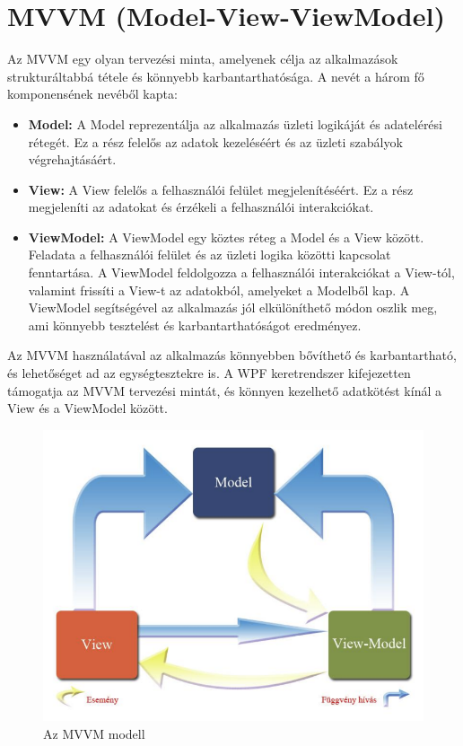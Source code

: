 \documentclass[
]{thesis-ekf}
\theoremstyle{definition}
\theoremstyle{remark}
\begin{document}
\section{MVVM (Model-View-ViewModel)}
Az MVVM egy olyan tervezési minta, amelyenek célja az alkalmazások strukturáltabbá tétele és könnyebb karbantarthatósága. A nevét a három fő komponensének nevéből kapta:
\begin{itemize}
	
	\item \textbf{Model:} A Model reprezentálja az alkalmazás üzleti logikáját és adatelérési rétegét. Ez a rész felelős az adatok kezeléséért és az üzleti szabályok végrehajtásáért.

	\item \textbf{View:} A View felelős a felhasználói felület megjelenítéséért. Ez a rész megjeleníti az adatokat és érzékeli a felhasználói interakciókat.

	\item \textbf{ViewModel:} A ViewModel egy köztes réteg a Model és a View között. Feladata a felhasználói felület és az üzleti logika közötti kapcsolat fenntartása. A ViewModel feldolgozza a felhasználói interakciókat a View-tól, valamint frissíti a View-t az adatokból, amelyeket a Modelből kap. A ViewModel segítségével az alkalmazás jól elkülöníthető módon oszlik meg, ami könnyebb tesztelést és karbantarthatóságot eredményez.
\end{itemize}
Az MVVM használatával az alkalmazás könnyebben bővíthető és karbantartható, és lehetőséget ad az egységtesztekre is. A WPF keretrendszer kifejezetten támogatja az MVVM tervezési mintát, és könnyen kezelhető adatkötést kínál a View és a ViewModel között.
	\begin{figure}[!ht]
		\centering
		\includegraphics[width=12cm]{mvvm}
		\caption{Az MVVM modell \cite{Progtech}}
		\label{picture-mvvm}
	\end{figure}
\end{document}
